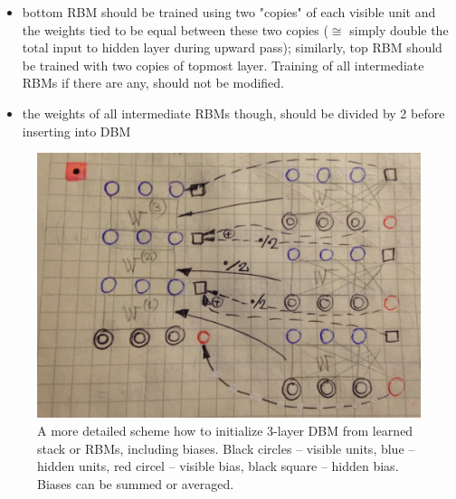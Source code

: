 \begin{itemize}
	\item bottom RBM should be trained using two "copies" of each visible unit and the weights tied to be equal between these two copies ($\cong$ simply double the total input to hidden layer during upward pass); similarly, top RBM should be trained with two copies of topmost layer. Training of all intermediate RBMs if there are any, should not be modified.
	\item the weights of all intermediate RBMs though, should be divided by 2 before inserting into DBM
\end{itemize}
\begin{figure}[h]
\begin{mdframed}
\includegraphics[scale=0.08]{dbm/dbm_init.jpg}
\centering
\caption{A more detailed scheme how to initialize 3-layer DBM from learned stack or RBMs, including biases. Black circles -- visible units, blue -- hidden units, red circel -- visible bias, black square -- hidden bias. Biases can be summed or averaged.}
\label{fig:dbm_init}
\end{mdframed}
\end{figure}

